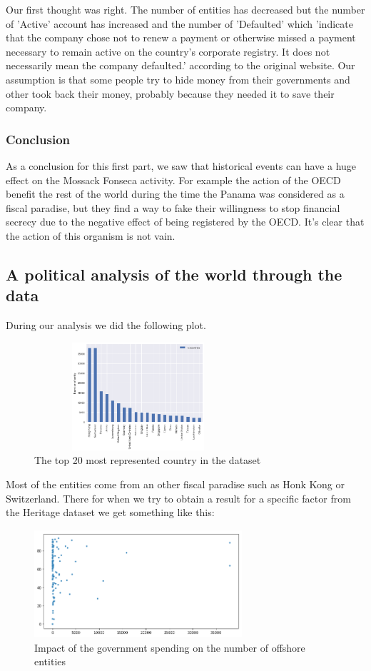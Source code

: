 \documentclass[11pt]{article}
\begin{document}
Our first thought was right. The number of entities has decreased but the number of 'Active' account has increased and the number of 'Defaulted' which 'indicate that the company chose not to renew a payment or otherwise missed a payment necessary to remain active on the country's corporate registry. It does not necessarily mean the company defaulted.' according to the original website. Our assumption is that some people try to hide money from their governments and other took back their money, probably because they needed it to save their company.

\subsubsection{Conclusion}
As a conclusion for this first part, we saw that historical events can have a huge effect on the Mossack Fonseca activity. For example the action of the OECD benefit the rest of the world during the time the Panama was considered as a fiscal paradise, but they find a way to fake their willingness to stop financial secrecy due to the negative effect of being registered by the OECD. It's clear that the action of this organism is not vain.

\subsection{A political analysis of the world through the data}

During our analysis we did the following plot. 
\begin{figure}[h]
	\centering
    \includegraphics[width=7.7cm,height=4cm]{country}
    \caption{The top 20 most represented country in the dataset}
    \label{fig:i}
\end{figure}

Most of the entities come from an other fiscal paradise such as Honk Kong or Switzerland. There for when we try to obtain a result for a specific factor from the Heritage dataset we get something like this: 

\begin{figure}[h]
	\centering
    \includegraphics[width=7.7cm,height=4cm]{gov_spending}
    \caption{Impact of the government spending on the number of offshore entities}
    \label{fig:j}
\end{figure}    
\end{document}
